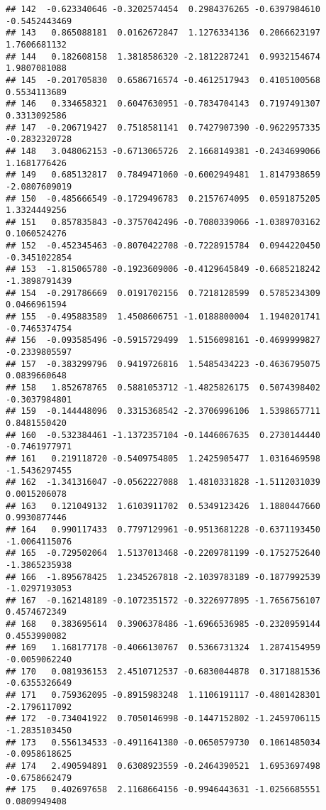 \documentclass[
]{article}
\begin{document}
\begin{verbatim}
## 142  -0.623340646 -0.3202574454  0.2984376265 -0.6397984610 -0.5452443469
## 143   0.865088181  0.0162672847  1.1276334136  0.2066623197  1.7606681132
## 144   0.182608158  1.3818586320 -2.1812287241  0.9932154674  1.9807081088
## 145  -0.201705830  0.6586716574 -0.4612517943  0.4105100568  0.5534113689
## 146   0.334658321  0.6047630951 -0.7834704143  0.7197491307  0.3313092586
## 147  -0.206719427  0.7518581141  0.7427907390 -0.9622957335 -0.2832320728
## 148   3.048062153 -0.6713065726  2.1668149381 -0.2434699066  1.1681776426
## 149   0.685132817  0.7849471060 -0.6002949481  1.8147938659 -2.0807609019
## 150  -0.485666549 -0.1729496783  0.2157674095  0.0591875205  1.3324449256
## 151   0.857835843 -0.3757042496 -0.7080339066 -1.0389703162  0.1060524276
## 152  -0.452345463 -0.8070422708 -0.7228915784  0.0944220450 -0.3451022854
## 153  -1.815065780 -0.1923609006 -0.4129645849 -0.6685218242 -1.3898791439
## 154  -0.291786669  0.0191702156  0.7218128599  0.5785234309  0.0466961594
## 155  -0.495883589  1.4508606751 -1.0188800004  1.1940201741 -0.7465374754
## 156  -0.093585496 -0.5915729499  1.5156098161 -0.4699999827 -0.2339805597
## 157  -0.383299796  0.9419726816  1.5485434223 -0.4636795075  0.0839660648
## 158   1.852678765  0.5881053712 -1.4825826175  0.5074398402 -0.3037984801
## 159  -0.144448096  0.3315368542 -2.3706996106  1.5398657711  0.8481550420
## 160  -0.532384461 -1.1372357104 -0.1446067635  0.2730144440 -0.7461977971
## 161   0.219118720 -0.5409754805  1.2425905477  1.0316469598 -1.5436297455
## 162  -1.341316047 -0.0562227088  1.4810331828 -1.5112031039  0.0015206078
## 163   0.121049132  1.6103911702  0.5349123426  1.1880447660  0.9930877446
## 164   0.990117433  0.7797129961 -0.9513681228 -0.6371193450 -1.0064115076
## 165  -0.729502064  1.5137013468 -0.2209781199 -0.1752752640 -1.3865235938
## 166  -1.895678425  1.2345267818 -2.1039783189 -0.1877992539 -1.0297193053
## 167  -0.162148189 -0.1072351572 -0.3226977895 -1.7656756107  0.4574672349
## 168   0.383695614  0.3906378486 -1.6966536985 -0.2320959144  0.4553990082
## 169   1.168177178 -0.4066130767  0.5366731324  1.2874154959 -0.0059062240
## 170   0.081936153  2.4510712537 -0.6830044878  0.3171881536 -0.6355326649
## 171   0.759362095 -0.8915983248  1.1106191117 -0.4801428301 -2.1796117092
## 172  -0.734041922  0.7050146998 -0.1447152802 -1.2459706115 -1.2835103450
## 173   0.556134533 -0.4911641380 -0.0650579730  0.1061485034 -0.0958618625
## 174   2.490594891  0.6308923559 -0.2464390521  1.6953697498 -0.6758662479
## 175   0.402697658  2.1168664156 -0.9946443631 -1.0256685551  0.0809949408

\end{verbatim}
\end{document}
